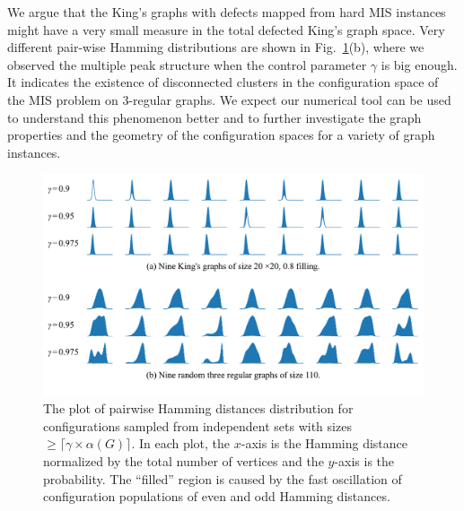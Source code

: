 \documentclass[onefignum, onetabnum]{siamart190516}
\newcommand{\<}{\langle}
\renewcommand{\>}{\rangle}
\newcommand{\Fig}[1]{Fig.~\ref{#1}}
\begin{document}
We argue that the King's graphs with defects mapped from hard MIS instances might have a very small measure in the total defected King's graph space.
Very different pair-wise Hamming distributions are shown in \Fig{fig:hamming}(b), where we observed the multiple peak structure when the control parameter $\gamma$ is big enough. It indicates the existence of disconnected clusters in the configuration space of the MIS problem on $3$-regular graphs.
We expect our numerical tool can be used to understand this phenomenon better and to further investigate the graph properties and the geometry of the configuration spaces for a variety of graph instances.
\begin{figure} 
    \includegraphics[width=\textwidth, trim={0.0cm 1cm 0.0cm 0cm}, clip]{figures/fig6.pdf}
    \caption{The plot of pairwise Hamming distances distribution for configurations sampled from independent sets with sizes $\geq \lceil\gamma \times \alpha(G)\rceil$.
    In each plot, the $x$-axis is the Hamming distance normalized by the total number of vertices and the $y$-axis is the probability.
    The ``filled'' region is caused by the fast oscillation of configuration populations of even and odd Hamming distances.
    }
    \label{fig:hamming}
\end{figure}
\end{document}
